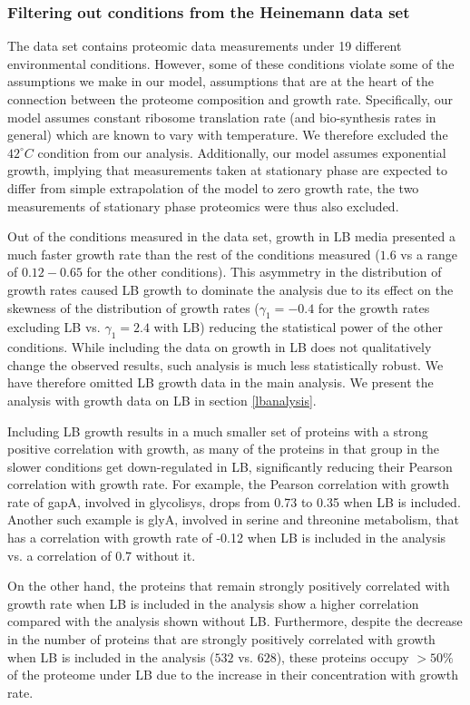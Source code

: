 \subsubsection{Filtering out conditions from the Heinemann data set}
\label{heinemanncond} 

The \cite{Heinemann2015} data set contains proteomic data measurements under 19 different environmental conditions.
However, some of these conditions violate some of the assumptions we make in our model, assumptions that are at the heart of the connection between the proteome composition and growth rate.
Specifically, our model assumes constant ribosome translation rate (and bio-synthesis rates in general) which are known to vary with temperature.
We therefore excluded the $42^\circ C$ condition from our analysis.
Additionally, our model assumes exponential growth, implying that measurements taken at stationary phase are expected to differ from simple extrapolation of the model to zero growth rate, the two measurements of stationary phase proteomics were thus also excluded.

Out of the conditions measured in the \cite{Heinemann2015} data set, growth in LB media presented a much faster growth rate than the rest of the conditions measured ($1.6$ vs a range of $0.12-0.65$ for the other conditions).
This asymmetry in the distribution of growth rates caused LB growth to dominate the analysis due to its effect on the skewness of the distribution of growth rates ($\gamma_1=-0.4$ for the growth rates excluding LB vs. $\gamma_1=2.4$ with LB) reducing the statistical power of the other conditions.
While including the data on growth in LB does not qualitatively change the observed results, such analysis is much less statistically robust.
We have therefore omitted LB growth data in the main analysis.
We present the analysis with growth data on LB in section \ref{lbanalysis}.

Including LB growth results in a much smaller set of proteins with a strong positive correlation with growth, as many of the proteins in that group in the slower conditions get down-regulated in LB, significantly reducing their Pearson correlation with growth rate.
For example, the Pearson correlation with growth rate of gapA, involved in glycolisys, drops from 0.73 to 0.35 when LB is included.
Another such example is glyA, involved in serine and threonine metabolism, that has a correlation with
growth rate of -0.12 when LB is included in the analysis vs. a correlation of 0.7 without it.

On the other hand, the proteins that remain strongly positively correlated with growth rate when LB is included in the analysis show a higher correlation compared with the analysis shown without LB.
Furthermore, despite the decrease in the number of proteins that are strongly positively correlated with growth when LB is included in the analysis ($532$ vs. $628$), these proteins occupy $>50\%$ of the proteome under LB due to the increase in their concentration with growth rate.